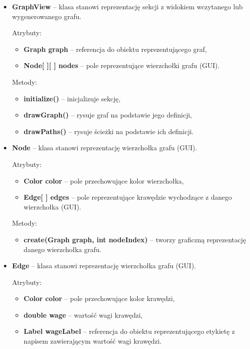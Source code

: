 \documentclass{article}
\begin{document}
\begin{itemize}
\newpage
    
    \item \textbf{GraphView} -- klasa stanowi reprezentację sekcji z widokiem wczytanego lub wygenerowanego grafu.
    
    Atrybuty:
    \begin{itemize}
        \item \textbf{Graph graph} -- referencja do obiektu reprezentującego graf,
        \item \textbf{Node[ ][ ] nodes} -- pole reprezentujące wierzchołki grafu (GUI).
    \end{itemize}
    
    Metody:
    \begin{itemize}
        \item \textbf{initialize()} -- inicjalizuje sekcję,
        \item \textbf{drawGraph()} -- rysuje graf na podstawie jego definicji,
        \item \textbf{drawPaths()} -- rysuje ścieżki na podstawie ich definicji.
    \end{itemize}
    
    \item \textbf{Node} -- klasa stanowi reprezentację wierzchołka grafu (GUI).
    
    Atrybuty:
    \begin{itemize}
        \item \textbf{Color color} -- pole przechowujące kolor wierzchołka,
        \item \textbf{Edge[ ] edges} -- pole reprezentujące krawędzie wychodzące z danego wierzchołka (GUI).
    \end{itemize}
    
    Metody:
    \begin{itemize}
        \item \textbf{create(Graph graph, int nodeIndex)} -- tworzy graficzną reprezentację danego wierzchołka grafu.
    \end{itemize}
    
    \item \textbf{Edge} -- klasa stanowi reprezentację wierzchołka grafu (GUI).
    
    Atrybuty:
    \begin{itemize}
        \item \textbf{Color color} -- pole przechowujące kolor krawędzi,
        \item \textbf{double wage} -- wartość wagi krawędzi,
        \item \textbf{Label wageLabel} -- referencja do obiektu reprezentującego etykietę z napisem zawierającym wartość wagi krawędzi.
    \end{itemize}
    

\end{itemize}
\end{document}
